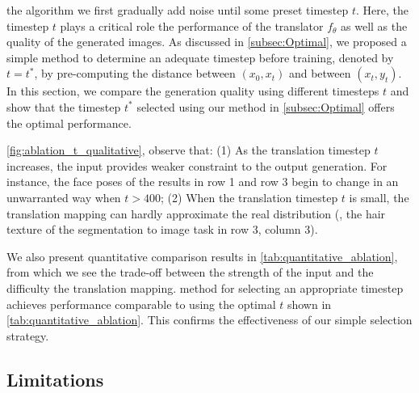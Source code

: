  the \method algorithm\sqq{,} we first gradually add noise  until some preset timestep $t$.
%
Here, the timestep $t$ plays a critical role  the performance of the translator $f_{\theta}$ as well as the quality of the generated images.
%
As discussed in \cref{subsec:Optimal}, we proposed a simple method to determine an adequate timestep before training, denoted by $t=t^*$, by pre-computing the distance between $(x_0, x_t)$ and between $(x_t, y_t)$.
%
In this section, we compare the generation quality using different timesteps $t$ and show that the timestep $t^*$ selected using our method in \cref{subsec:Optimal} offers the optimal performance.

 \cref{fig:ablation_t_qualitative},  observe that:
%
(1) As the translation timestep $t$ increases, the input  provides weaker constraint to the output generation.
%
For instance, the face poses of the results in row 1 and row 3 begin to change in an unwarranted way when $t>400$;
%
(2) When the translation timestep $t$ is small, the translation mapping can hardly approximate the real distribution (, the hair texture of the segmentation to image task in row 3, column 3).

We also present quantitative comparison results in \cref{tab:quantitative_ablation}, from which we see the trade-off between the strength of the input  and the difficulty  the translation mapping.
%
 method for selecting an appropriate timestep achieves performance comparable to using the optimal $t$ shown in \cref{tab:quantitative_ablation}. This confirms the effectiveness of our simple selection strategy.


\subsection{Limitations}\label{subsec:Discussion}

